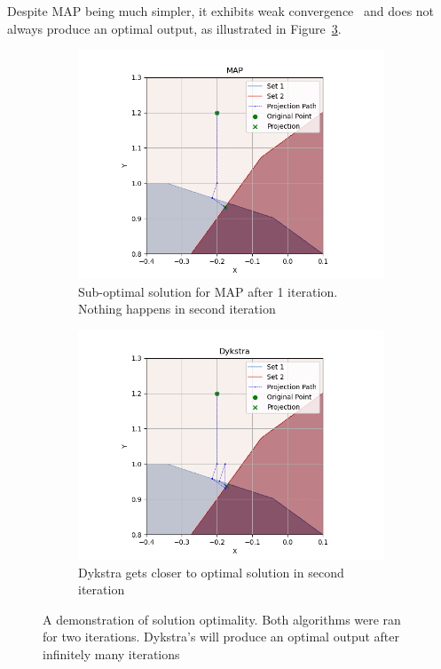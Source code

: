 \documentclass[hidelinks]{article}
\begin{document}
%
\newline
Despite MAP being much simpler, it exhibits weak convergence~\cite{BREGMAN} and does not always produce an optimal output, as illustrated in Figure~\ref{fig:demonstration}.
%
\begin{figure}[h]
    \centering
    
    \begin{subfigure}[t]{0.49\textwidth}
        \centering
        \includegraphics[width=1\textwidth]{MAP_demonstration.png}
        \caption{Sub-optimal solution for MAP after 1 iteration. Nothing happens in second iteration}
        \label{fig:demonstrationMAP}
    \end{subfigure}
    \hfill
    \begin{subfigure}[t]{0.49\textwidth}
        \centering
        \includegraphics[width=1\textwidth]{Dykstra_demonstration.png}
        \caption{Dykstra gets closer to optimal solution in second iteration}
        \label{fig:demonstrationDykstra}
    \end{subfigure}
    \caption{A demonstration of solution optimality. Both algorithms were ran for two iterations. Dykstra's will produce an optimal output after infinitely many iterations}
    \label{fig:demonstration}
\end{figure}
\end{document}
